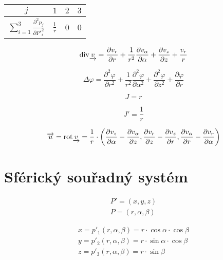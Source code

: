 \begin{tabular}{| c || c | c | c |}
\hline
\(j\) & \(1\) & \(2\) & \(3\) \\
\hline
\hline
\(\sum_{i=1}^3 \frac{\partial^2 p_j}{\partial P'^2_i}\) & \(\frac{1}{r}\) & 0 & 0 \\
\hline
\end{tabular}

\begin{equation}
\label{eq:cylindricky_ss_div}
\mathrm{div}{\underrightarrow{v}} = \frac{\partial v_r}{\partial r} + \frac{1}{r^2} \frac{\partial v_{\alpha}}{\partial \alpha} + \frac{\partial v_z}{\partial z} + \frac{v_r}{r}
\end{equation}

\begin{equation}
\label{eq:cylindricky_ss_laplace}
\Delta \varphi = \frac{\partial^2 \varphi}{\partial r^2} + \frac{1}{r^2} \frac{\partial^2 \varphi}{\partial \alpha^2} + \frac{\partial^2 \varphi}{\partial z^2} + \frac{\partial \varphi}{\partial r}
\end{equation}

\begin{equation}
\label{eq:cylindricky_ss_j}
J = r
\end{equation}

\begin{equation}
\label{eq:cylindricky_ss_j_inv}
J' = \frac{1}{r}
\end{equation}

\begin{equation}
\label{eq:cylindricky_ss_rotace}
\overrightarrow{u} = \mathrm{rot} \underrightarrow{v} = \frac{1}{r} \cdot \left( \frac{\partial v_{z}}{\partial \alpha} - \frac{\partial v_{\alpha}}{\partial z}, \frac{\partial v_{r}}{\partial z} - \frac{\partial v_{z}}{\partial r}, \frac{\partial v_{\alpha}}{\partial r} - \frac{\partial v_{r}}{\partial \alpha} \right)
\end{equation}


\section{Sférický souřadný systém}

\begin{equation}
\begin{split}
P' = (x, y, z) \\
P = (r, \alpha, \beta)
\end{split}
\end{equation}

\begin{equation}
\begin{split}
x = p'_1(r, \alpha, \beta) = r \cdot \cos \alpha \cdot \cos \beta \\
y = p'_2(r, \alpha, \beta) = r \cdot \sin \alpha \cdot \cos \beta \\
z = p'_3(r, \alpha, \beta) = r \cdot \sin \beta
\end{split}
\end{equation}

